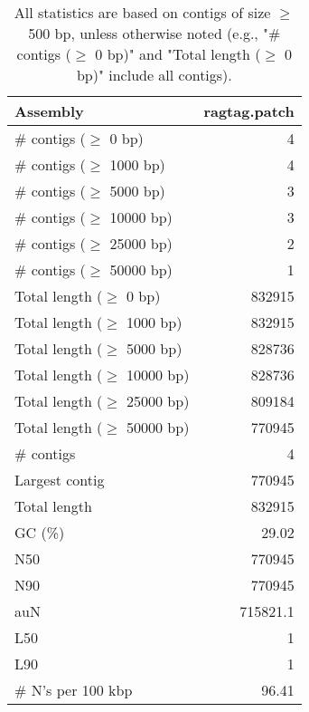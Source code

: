 \documentclass[12pt,a4paper]{article}
\begin{document}
\begin{table}[ht]
\begin{center}
\caption{All statistics are based on contigs of size $\geq$ 500 bp, unless otherwise noted (e.g., "\# contigs ($\geq$ 0 bp)" and "Total length ($\geq$ 0 bp)" include all contigs).}
\begin{tabular}{|l*{1}{|r}|}
\hline
Assembly & ragtag.patch \\ \hline
\# contigs ($\geq$ 0 bp) & 4 \\ \hline
\# contigs ($\geq$ 1000 bp) & 4 \\ \hline
\# contigs ($\geq$ 5000 bp) & 3 \\ \hline
\# contigs ($\geq$ 10000 bp) & 3 \\ \hline
\# contigs ($\geq$ 25000 bp) & 2 \\ \hline
\# contigs ($\geq$ 50000 bp) & 1 \\ \hline
Total length ($\geq$ 0 bp) & 832915 \\ \hline
Total length ($\geq$ 1000 bp) & 832915 \\ \hline
Total length ($\geq$ 5000 bp) & 828736 \\ \hline
Total length ($\geq$ 10000 bp) & 828736 \\ \hline
Total length ($\geq$ 25000 bp) & 809184 \\ \hline
Total length ($\geq$ 50000 bp) & 770945 \\ \hline
\# contigs & 4 \\ \hline
Largest contig & 770945 \\ \hline
Total length & 832915 \\ \hline
GC (\%) & 29.02 \\ \hline
N50 & 770945 \\ \hline
N90 & 770945 \\ \hline
auN & 715821.1 \\ \hline
L50 & 1 \\ \hline
L90 & 1 \\ \hline
\# N's per 100 kbp & 96.41 \\ \hline
\end{tabular}
\end{center}
\end{table}
\end{document}
